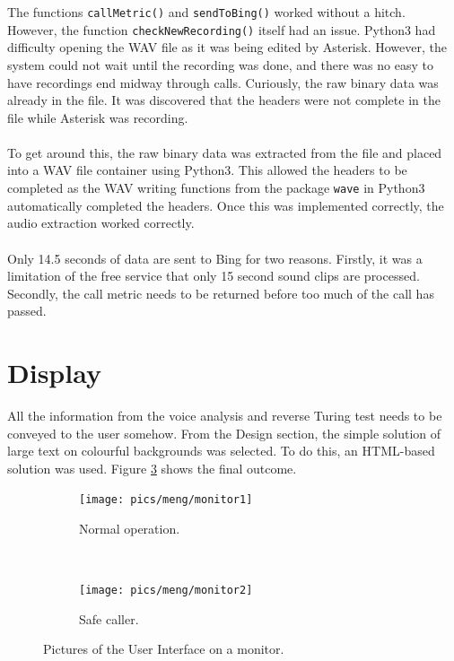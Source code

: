 \documentclass[main.tex]{subfiles}
\begin{document}
The functions \texttt{callMetric()} and \texttt{sendToBing()} worked without a hitch. However, the function \texttt{checkNewRecording()} itself had an issue. Python3 had difficulty opening the WAV file as it was being edited by Asterisk. However, the system could not wait until the recording was done, and there was no easy to have recordings end midway through calls. Curiously, the raw binary data was already in the file. It was discovered that the headers were not complete in the file while Asterisk was recording.
\\\\
To get around this, the raw binary data was extracted from the file and placed into a WAV file container using Python3. This allowed the headers to be completed as the WAV writing functions from the package \texttt{wave} in Python3 automatically completed the headers. Once this was implemented correctly, the audio extraction worked correctly.
\\\\
Only 14.5 seconds of data are sent to Bing for two reasons. Firstly, it was a limitation of the free service that only 15 second sound clips are processed. Secondly, the call metric needs to be returned before too much of the call has passed.

\section{Display}
All the information from the voice analysis and reverse Turing test needs to be conveyed to the user somehow. From the Design section, the simple solution of large text on colourful backgrounds was selected. To do this, an HTML-based solution was used. Figure \ref{fig:displays} shows the final outcome.

\begin{figure}[htb]
	\captionsetup[subfigure]{position=b}
        \centering
        \begin{subfigure}{0.47\textwidth}
                \texttt{[image: pics/meng/monitor1]}
                \caption{Normal operation.}
                \label{fig:display1}
        \end{subfigure}
        ~
		\begin{subfigure}{0.47\textwidth}
                \texttt{[image: pics/meng/monitor2]}
                \caption{Safe caller.}
                \label{fig:display2}
        \end{subfigure}
	\caption{Pictures of the User Interface on a monitor.}
	\label{fig:displays}
\end{figure}
\end{document}
